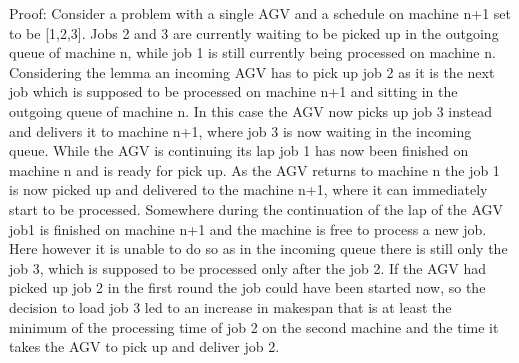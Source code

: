 Proof: Consider a problem with a single AGV and a schedule on machine n+1 set to be [1,2,3]. Jobs 2 and 3 are currently waiting to be picked up 
in the outgoing queue of machine n, while job 1 is still currently being processed on machine n. Considering the lemma an incoming AGV has to pick
up job 2 as it is the next job which is supposed to be processed on machine n+1 and sitting in the outgoing queue of machine n. In this case the 
AGV now picks up job 3 instead and delivers it to machine n+1, where job 3 is now waiting in the incoming queue. While the AGV is continuing its
lap job 1 has now been finished on machine n and is ready for pick up. As the AGV returns to machine n the job 1 is now picked up and delivered
to the machine n+1, where it can immediately start to be processed. Somewhere during the continuation of the lap of the AGV job1 is finished on
machine n+1 and the machine is free to process a new job. Here however it is unable to do so as in the incoming queue there is still only the
job 3, which is supposed to be processed only after the job 2. If the AGV had picked up job 2 in the first round the job could have been started
now, so the decision to load job 3 led to an increase in makespan that is at least the minimum of the processing time of job 2 on the second
machine and the time it takes the AGV to pick up and deliver job 2.